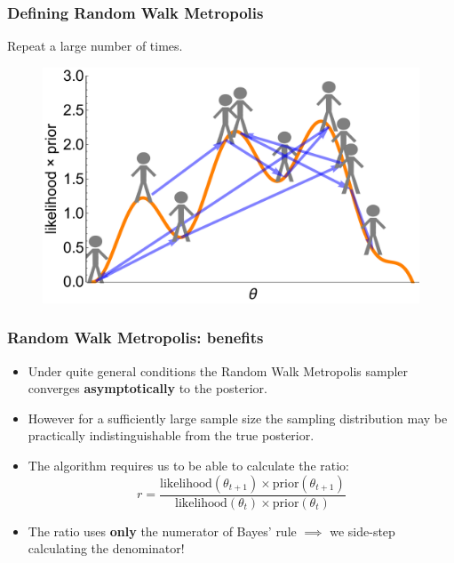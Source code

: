\documentclass[handout]{beamer}
\begin{document}
\begin{frame}
\frametitle{Defining Random Walk Metropolis}
Repeat a large number of times.

\begin{figure}[ht]
\centerline{\includegraphics[width=1\textwidth]{./Figures/lec4_metropolisDefinitionFinal.pdf}}
\end{figure}

\end{frame}

\begin{frame}
\frametitle{Random Walk Metropolis: benefits}

\begin{itemize}
\item<2-> Under quite general conditions the Random Walk Metropolis sampler converges \textbf{asymptotically} to the posterior.
\item<3-> However for a sufficiently large sample size the sampling distribution may be practically indistinguishable from the true posterior.
\item<4-> The algorithm requires us to be able to calculate the ratio:
\begin{equation}
r = \frac{\text{likelihood}(\theta_{t+1})\times\text{prior}(\theta_{t+1})}{\text{likelihood}(\theta_{t})\times\text{prior}(\theta_{t})}
\end{equation}
\item<6-> The ratio uses \textbf{only} the numerator of Bayes' rule $\implies$ we side-step calculating the denominator!
\end{itemize}

\end{frame}
\end{document}
